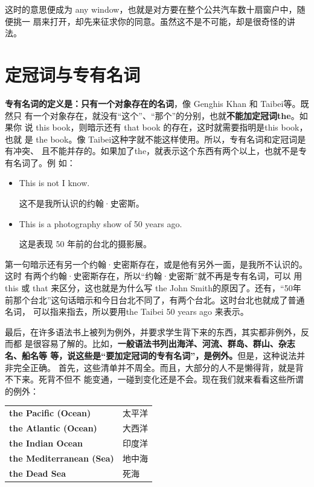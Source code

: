 这时的意思便成为 any window，也就是对方要在整个公共汽车数十扇窗户中，随便挑一
扇来打开，却先来征求你的同意。虽然这不是不可能，却是很奇怪的讲法。

\section{定冠词与专有名词}

\textbf{专有名词的定义是：只有一个对象存在的名词}，像 Genghis Khan 和 Taibei等。既然只
有一个对象存在，就没有“这个”、“那个”的分别，也就\textbf{不能加定冠词the}。如果你
说 this book，则暗示还有 that book 的存在，这时就需要指明是this book，也就
是 the book。像 Taibei这种字就不能这样使用。所以，专有名词和定冠词是有冲突、
且不能并存的。如果加了the，就表示这个东西有两个以上，也就不是专有名词了。例
如：

\begin{itemize}
\item  This is not  I know.

这不是我所认识的约翰·史密斯。
\item  This is a photography show of  50 years ago.

这是表现 50 年前的台北的摄影展。
\end{itemize}

第一句暗示还有另一个约翰·史密斯存在，或是他有另外一面，是我所不认识的。这时
有两个约翰·史密斯存在，所以“约翰·史密斯”就不再是专有名词，可以
用this 或 that 来区分，这也就是为什么写 the John Smith的原因了。还有，“50年
前那个台北”这句话暗示和今日台北不同了，有两个台北。这时台北也就成了普通名词，
可以指来指去，所以要用the Taibei 50 years ago 来表示。

最后，在许多语法书上被列为例外，并要求学生背下来的东西，其实都非例外，反而都
是很容易了解的。比如，\textbf{一般语法书列出海洋、河流、群岛、群山、杂志名、船名等
  等，说这些是“要加定冠词的专有名词”，是例外。}但是，这种说法并非完全正确。
首先，这些清单并不周全。而且，大部分的人不是懒得背，就是背不下来。死背不但不
能变通，一碰到变化还是不会。现在我们就来看看这些所谓的例外：

\begin{longtable}[]{@{}ll@{}}
  \textbf{the Pacific (Ocean)} & 太平洋 \\
  \textbf{the Atlantic (Ocean)} & 大西洋 \\
  \textbf{the Indian Ocean} & 印度洋 \\
  \textbf{the Mediterranean (Sea)} & 地中海 \\
  \textbf{the Dead Sea} & 死海 \\
\end{longtable}

